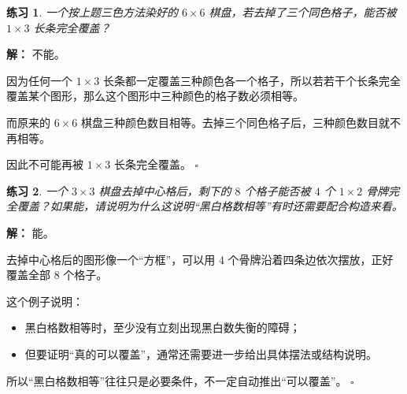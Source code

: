\documentclass[11pt,a4paper,fontset=fandol]{ctexart}
\theoremstyle{formaltheorem}
\theoremstyle{formalexample}
\newtheorem{exercise}{练习}[section]
\newenvironment{solution}{\par\noindent\textbf{解：}}{\hfill$\square$\par}
\begin{document}
\begin{exercise}
一个按上题三色方法染好的 $6\times 6$ 棋盘，若去掉了三个同色格子，能否被 $1\times 3$ 长条完全覆盖？
\end{exercise}

\begin{solution}
不能。

因为任何一个 $1\times 3$ 长条都一定覆盖三种颜色各一个格子，所以若若干个长条完全覆盖某个图形，那么这个图形中三种颜色的格子数必须相等。

而原来的 $6\times 6$ 棋盘三种颜色数目相等。去掉三个同色格子后，三种颜色数目就不再相等。

因此不可能再被 $1\times 3$ 长条完全覆盖。
\end{solution}

\begin{exercise}
一个 $3\times 3$ 棋盘去掉中心格后，剩下的 $8$ 个格子能否被 $4$ 个 $1\times 2$ 骨牌完全覆盖？如果能，请说明为什么这说明“黑白格数相等”有时还需要配合构造来看。
\end{exercise}

\begin{solution}
能。

去掉中心格后的图形像一个“方框”，可以用 $4$ 个骨牌沿着四条边依次摆放，正好覆盖全部 $8$ 个格子。

这个例子说明：
\begin{itemize}
  \item 黑白格数相等时，至少没有立刻出现黑白数失衡的障碍；
  \item 但要证明“真的可以覆盖”，通常还需要进一步给出具体摆法或结构说明。
\end{itemize}

  所以“黑白格数相等”往往只是必要条件，不一定自动推出“可以覆盖”。
\end{solution}
\end{document}
